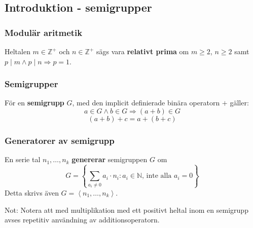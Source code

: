 \documentclass{beamer}
\begin{document}
\subsection{Introduktion - semigrupper}

\begin{frame}
	\frametitle{Modulär aritmetik}
\begin{Definition}
	Heltalen $m \in \mathbb{Z}^+$ och $n \in \mathbb{Z}^+$ sägs vara \textbf{relativt prima} om $m \geq 2$, $n \geq 2$ samt $p \mid m \wedge p \mid n \Longrightarrow p = 1$.
\end{Definition}
\end{frame}

\begin{frame}
	\frametitle{Semigrupper}
\begin{Definition}
	För en \textbf{semigrupp} $G$, med den implicit definierade binära operatorn $+$ gäller:
	\[a \in G \wedge b \in G \Longrightarrow (a + b) \in G\]
	\[(a+b)+c = a+(b+c)\]
\end{Definition}
\end{frame}

\begin{frame}
	\frametitle{Generatorer av semigrupp}
\begin{Definition}
	En serie tal $n_1, \ldots, n_k$ \textbf{genererar} semigruppen $G$ om
	\[G = \left\{\sum_{a_i\neq 0} a_i \cdot n_i : a_i \in \mathbb{N}\text{, inte alla $a_i=0$}\right\}\]
	Detta skrivs även $G = \left<n_1, \ldots, n_k \right>$.
\end{Definition}

\vspace{20pt}
\scriptsize Not: Notera att med multiplikation med ett positivt heltal inom en semigrupp avses repetitiv användning av additionsoperatorn.
\end{frame}
\end{document}
